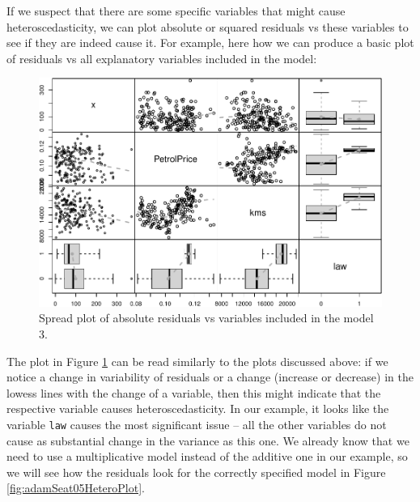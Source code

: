 \documentclass[
]{book}
\newenvironment{Shaded}{\begin{snugshade}}{\end{snugshade}}
\newcommand{\AttributeTok}[1]{\textcolor[rgb]{0.77,0.63,0.00}{#1}}
\newcommand{\ConstantTok}[1]{\textcolor[rgb]{0.00,0.00,0.00}{#1}}
\newcommand{\DecValTok}[1]{\textcolor[rgb]{0.00,0.00,0.81}{#1}}
\newcommand{\FunctionTok}[1]{\textcolor[rgb]{0.00,0.00,0.00}{#1}}
\newcommand{\NormalTok}[1]{#1}
\newcommand{\SpecialCharTok}[1]{\textcolor[rgb]{0.00,0.00,0.00}{#1}}
\theoremstyle{definition}
\theoremstyle{definition}
\theoremstyle{definition}
\theoremstyle{definition}
\theoremstyle{remark}
\begin{document}
If we suspect that there are some specific variables that might cause heteroscedasticity, we can plot absolute or squared residuals vs these variables to see if they are indeed cause it. For example, here how we can produce a basic plot of residuals vs all explanatory variables included in the model:

\begin{Shaded}
\end{Shaded}

\begin{figure}
\centering
\includegraphics{Svetunkov--2022----ADAM_files/figure-latex/adamSeat03Spread-1.pdf}
\caption{\label{fig:adamSeat03Spread}Spread plot of absolute residuals vs variables included in the model 3.}
\end{figure}

The plot in Figure \ref{fig:adamSeat03Spread} can be read similarly to the plots discussed above: if we notice a change in variability of residuals or a change (increase or decrease) in the lowess lines with the change of a variable, then this might indicate that the respective variable causes heteroscedasticity. In our example, it looks like the variable \texttt{law} causes the most significant issue -- all the other variables do not cause as substantial change in the variance as this one. We already know that we need to use a multiplicative model instead of the additive one in our example, so we will see how the residuals look for the correctly specified model in Figure \ref{fig:adamSeat05HeteroPlot}.
\end{document}
